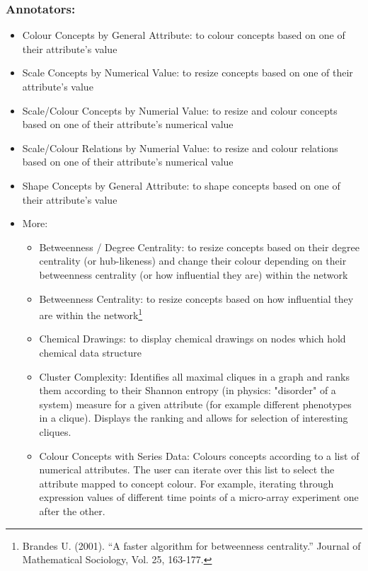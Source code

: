 \subsubsection{Annotators:}
   \begin{itemize}
   \item Colour Concepts by General Attribute: to colour concepts based on one of their attribute's value
   \item Scale Concepts by Numerical Value: to resize concepts based on one of their attribute's value
   \item Scale/Colour Concepts by Numerial Value: to resize and colour concepts based on one of their attribute's numerical value
   \item Scale/Colour Relations by Numerial Value: to resize and colour relations based on one of their attribute's numerical value
   \item Shape Concepts by General Attribute: to shape concepts based on one of their attribute's value
   \item More:
      \begin{itemize}
      \item Betweenness / Degree Centrality:
      to resize concepts based on their degree centrality (or hub-likeness) and change their colour depending on their betweenness centrality 
      (or how influential they are) within the network
      \item Betweenness Centrality:
      to resize concepts based on how influential they are within the network\footnote{
      Brandes U. (2001). ``A faster algorithm for betweenness centrality.'' Journal of Mathematical Sociology, Vol. 25, 163-177.}
      \item Chemical Drawings:
      to display chemical drawings on nodes which hold chemical data structure
      \item Cluster Complexity:
      Identifies all maximal cliques in a graph and ranks them according to their Shannon entropy (in physics: "disorder" of a system) measure for a given attribute 
      (for example different phenotypes in a clique). Displays the ranking and allows for selection of interesting cliques.
      \item Colour Concepts with Series Data:
      Colours concepts according to a list of numerical attributes. 
      The user can iterate over this list to select the attribute mapped to concept colour. 
      For example, iterating through expression values of different time points of a micro-array experiment one after the other.

\end{itemize}
\end{itemize}
